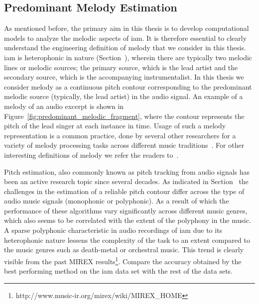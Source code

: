 {\subsection{Predominant Melody Estimation}
\label{sec:data_preprocessing_predominant_melody_estimation}

As mentioned before, the primary aim in this thesis is to develop computational models to analyze the melodic aspects of \gls{iam}. It is therefore essential to clearly understand  the engineering definition of melody that we consider in this thesis. \Gls{iam} is heterophonic in nature (Section~), wherein there are typically two melodic lines or melodic sources; the primary source, which is the lead artist and the secondary source, which is the accompanying instrumentalist. In this thesis we consider melody as a continuous pitch contour corresponding to the predominant melodic source (typically, the lead artist) in the audio signal. An example of a melody of an audio excerpt is shown in Figure~\ref{fig:predominant_melodic_fragment}, where the contour represents the pitch of the lead singer at each instance in time. Usage of such a melody representation is a common practice, done by several other researchers for a variety of melody processing tasks across different music traditions~\citep{Dutta2014,Ishwar2013,Rao2014,koduri2014intonation,senturk2013score,pikrakis2012tracking}.  For other interesting definitions of melody we refer the readers to~\citep{Salamon2012}. 


Pitch estimation, also commonly known as pitch tracking from audio signals has been an active research topic since several decades. As indicated in Section~ the challenges in the estimation of a reliable pitch contour differ across the type of audio music signals (monophonic or polyphonic). As a result of which the performance of these algorithms vary significantly across different music genres, which also seems to be correlated with the extent of the polyphony in the music. A sparse polyphonic characteristic in audio recordings of \gls{iam} due to its heterophonic nature lessens the complexity of the task to an extent compared to the music genres such as death-metal or orchestral music. This trend is clearly visible from the past MIREX results\footnote{http://www.music-ir.org/mirex/wiki/MIREX\_HOME}. Compare the accuracy obtained by the best performing method on the \gls{iam} data set with the rest of the data sets.

}
